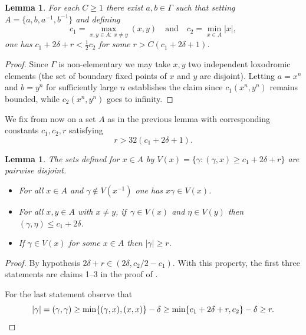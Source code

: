 \documentclass[10pt,a4paper]{amsart}
\newcommand{\quand}{\quad\text{and}\quad}
\newtheorem{lemma}[theorem]{Lemma}
\begin{document}
\begin{lemma}
For each \(C \ge 1\) there exist \(a,b \in \Gamma\) such that setting \(A = \lbrace a,b,a^{-1},b^{-1}\rbrace\) and defining
\[
c_1 = \max_{x,y \in A:\ x \neq y}(x,y)\quand c_2 = \min_{x \in A}|x|,
\]
one has \(c_1 + 2\delta + r < \frac{1}{2}{c_2}\) for some \(r > C(c_1+2\delta+1)\).
\end{lemma}
\begin{proof}
Since \(\Gamma\) is non-elementary we may take \(x,y\) two independent loxodromic elements (\ie the set of boundary fixed points of \(x\) and \(y\) are disjoint).
Letting \(a = x^n\) and \(b = y^n\) for sufficiently large \(n\) establishes the claim since \(c_1(x^n,y^n)\) remains bounded, while \(c_2(x^n,y^n)\) goes to infinity.
\end{proof}

We fix from now on a set \(A\) as in the previous lemma with corresponding constants \(c_1,c_2,r\) satisfying
\begin{equation}\label{requation}
r > 32(c_1+2\delta+1).
\end{equation}

\begin{lemma}\label{borrowedlemma}
The sets defined for \(x \in A\) by \(V(x) = \lbrace \gamma: (\gamma,x) \ge c_1+2\delta + r\rbrace\) are pairwise disjoint.

\begin{itemize}
\item
For all \(x \in A\) and \(\gamma \notin V(x^{-1})\) one has \(x\gamma \in V(x)\).

\item
For all \(x,y \in A\) with \(x \neq y\), if~\(\gamma \in V(x)\) and \(\eta \in V(y)\) then \((\gamma,\eta) \le c_1+2\delta\).

\item
If \(\gamma \in V(x)\) for some \(x \in A\) then \(|\gamma| \ge r\).
\end{itemize}
\end{lemma}
\begin{proof}
By hypothesis \(2\delta + r \in (2\delta,c_2/2 - c_1)\). With this property, the first three statements are claims 1--3 in the proof of \cite[Lem.\,4.1]{random}.

For the last statement observe that
\[
|\gamma| = (\gamma,\gamma) \ge \min\lbrace (\gamma,x),(x,x)\rbrace - \delta \ge \min \lbrace c_1 + 2\delta + r, c_2\rbrace - \delta \ge r.\qedhere
\]
\end{proof}
\end{document}
